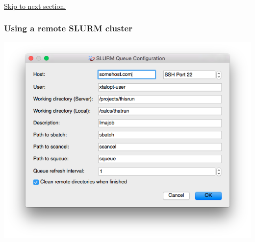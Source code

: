 \hyperlink{tut-xo_files}{Skip to next section.}\hypertarget{tut-xo_remoteslurm}{}\subsubsection{Using a remote S\+L\+U\+R\+M cluster}\label{tut-xo_remoteslurm}
 
\begin{DoxyImageNoCaption}
  \mbox{\includegraphics[width=\textwidth]{opt-set-slurm.png}}
\end{DoxyImageNoCaption}


